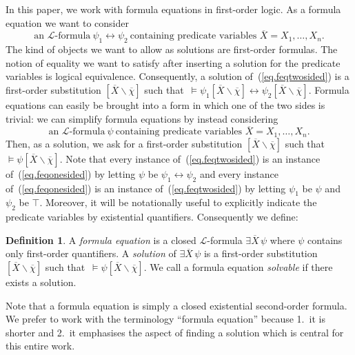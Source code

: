 \documentclass[acmsmall]{acmart}
\theoremstyle{plain}
\theoremstyle{definition}
\newtheorem{definition}[theorem]{Definition}
\newcommand{\calL}{\mathcal{L}}
\newcommand{\mybar}[1]{\overline{#1}}
\newcommand{\sop}{[} %
\newcommand{\scl}{]} %
\newcommand{\sel}[2]{#1 \backslash #2} %
\newcommand{\unsubst}[2]{\sop \sel{#1}{#2} \scl} %
\newcommand{\liff}{\leftrightarrow} %
\begin{document}
In this paper, we work with formula equations in first-order logic.
As a formula equation we want to consider
%
\begin{equation}\label{eq.feqtwosided}
\text{an $\calL$-formula}\ \psi_1 \liff \psi_2\ \text{containing predicate variables $\mybar{X} = X_1,\ldots,X_n$.}
\end{equation}
%
The kind of objects we want to allow as solutions are first-order formulas.
The notion of equality we want to satisfy after inserting a solution for the
 predicate variables is logical equivalence.
Consequently, a solution of~(\ref{eq.feqtwosided}) is a first-order substitution
 $\unsubst{\mybar{X}}{\mybar{\chi}}$ such that\ $\models \psi_1\unsubst{\mybar{X}}{\mybar{\chi}} \liff \psi_2 \unsubst{\mybar{X}}{\mybar{\chi}}$.
Formula equations can easily be brought into a form in which one of the two sides is trivial:
we can simplify formula equations by instead considering
\begin{equation}\label{eq.feqonesided}
\text{an $\calL$-formula}\ \psi\ \text{containing predicate variables $\mybar{X} = X_1,\ldots,X_n$.}
\end{equation}
Then, as a solution, we ask for a first-order substitution $\unsubst{\mybar{X}}{\mybar{\chi}}$ such that\ 
 $\models \psi\unsubst{\mybar{X}}{\mybar{\chi}}$.
Note that every instance of~(\ref{eq.feqtwosided}) is an instance of~(\ref{eq.feqonesided}) by letting $\psi$ be $\psi_1 \liff \psi_2$
 and every instance of~(\ref{eq.feqonesided}) is an instance of~(\ref{eq.feqtwosided}) by letting $\psi_1$ be $\psi$ and 
 $\psi_2$ be $\top$.
Moreover, it will be notationally useful to explicitly indicate the predicate variables by 
 existential quantifiers.
Consequently we define:
%
\begin{definition}
A {\em formula equation} is a closed $\calL$-formula $\exists \mybar{X}\, \psi$ where
 $\psi$ contains only first-order quantifiers.
A {\em solution} of $\exists \mybar{X}\, \psi$ is a first-order substitution
 $\sop\sel{\mybar{X}}{\mybar{\chi}}\scl$ such that\  $\models \psi\unsubst{\mybar{X}}{\mybar{\chi}}$. We call a formula equation \emph{solvable} if there exists a solution. 
\end{definition}
%
Note that a formula equation is simply a closed existential second-order formula.
We prefer to work with the terminology ``formula equation'' because 1.~it is shorter
 and 2.~it emphasises the aspect of finding a solution which is central for this entire work.
%
\end{document}
